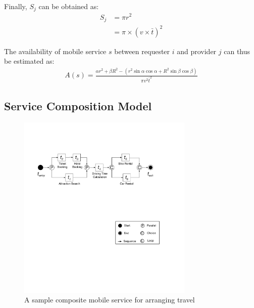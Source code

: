 \documentclass[journal]{IEEEtran}
\begin{document}
Finally, $S_j$ can be obtained as:
\begin{align}
S_j & = \pi r^2 \\\nonumber
& = \pi \times (v \times \bar{t})^2
\end{align}

The availability of mobile service $s$ between requester $i$ and provider $j$ can thus be estimated as:
\begin{align}
A(s) = \frac{\alpha r^2 + \beta R^2 - (r^2 \sin\alpha \cos\alpha + R^2 \sin\beta \cos\beta)}{\pi v^2 \bar{t}^2}
\end{align}

\subsection{Service Composition Model}
\begin{figure}[!t]
\centering
\includegraphics[width=3.3in]{./img/pic4.pdf}
\caption{A sample composite mobile service for arranging travel}
\label{A sample composite mobile service}
\end{figure}
\end{document}
